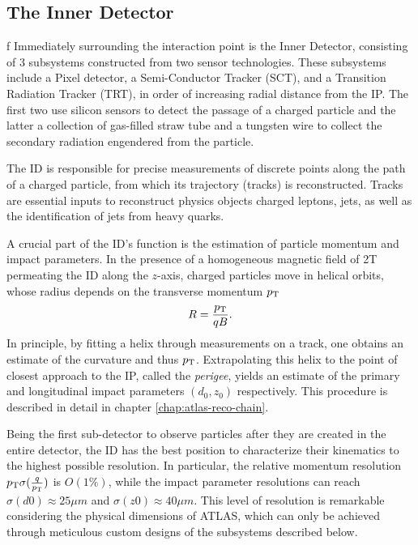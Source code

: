 \subsection{The Inner Detector}
\label{subsect:inner-detector}f
Immediately surrounding the interaction point is the Inner Detector, consisting of 3 subsystems constructed from two sensor technologies. These subsystems include a Pixel detector, a Semi-Conductor Tracker (SCT), and a Transition Radiation Tracker (TRT), in order of increasing radial distance from the IP. 
The first two use silicon sensors to detect the passage of a charged particle and the latter a collection of gas-filled straw tube and a tungsten wire to collect the secondary radiation engendered from the particle.

The ID is responsible for precise measurements of discrete points along the path of a charged particle, from which its trajectory (tracks) is reconstructed. 
Tracks are essential inputs to reconstruct physics objects charged leptons, jets, as well as the identification of jets from heavy quarks. 

A crucial part of the ID's function is the estimation of particle momentum and impact parameters. In the presence of a homogeneous magnetic field of 2T permeating the ID along the $z$-axis, charged particles move in helical orbits, whose radius depends on the transverse momentum $p_{\text{T}}$
\begin{equation}
    \label{eq:3.3}
    R = \frac{p_{\text{T}}}{qB}.
\end{equation}
In principle, by fitting a helix through measurements on a track, one obtains an estimate of the curvature and thus $p_{\text{T}}$. 
Extrapolating this helix to the point of closest approach to the IP, called the \textit{perigee}, yields an estimate of the primary and longitudinal impact parameters $(d_0, z_0)$ respectively. 
This procedure is described in detail in chapter \ref{chap:atlas-reco-chain}. 

Being the first sub-detector to observe particles after they are created in the entire detector, the ID has the best position to characterize their kinematics to the highest possible resolution. 
In particular, the relative momentum resolution $p_{\text{T}}\sigma(\frac{q}{p_{\text{T}}})$ is $O(1\%)$, while the impact parameter resolutions can reach $\sigma(d0)\approx 25\mu m$ and $\sigma(z0)\approx 40\mu m$.
This level of resolution is remarkable considering the physical dimensions of ATLAS, which can only be achieved through meticulous custom designs of the subsystems described below.

